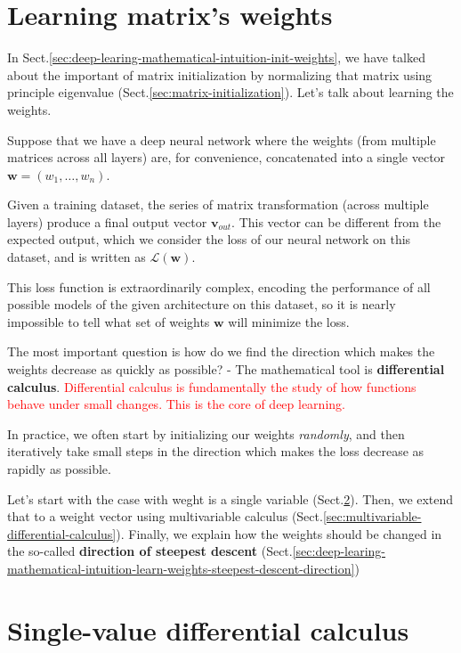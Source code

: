 \section{Learning matrix's weights}
\label{sec:learning-matrix-weights}
\label{sec:deep-learing-mathematical-intuition-learn-weights}

In Sect.\ref{sec:deep-learing-mathematical-intuition-init-weights},
we have talked about the important of matrix initialization by normalizing that
matrix using principle eigenvalue (Sect.\ref{sec:matrix-initialization}). Let's
talk about learning the weights.

Suppose that we have a deep neural network where the weights (from multiple
matrices across all layers) are, for convenience, concatenated into a single
vector $\mathbf{w} = (w_1, \ldots,w_n)$.

Given a training dataset, the series of matrix transformation (across multiple
layers) produce a final output vector $\mathbf{v}_{out}$.
This vector can be different from the expected output, which we consider the
loss of our neural network on this dataset, and is written as
$\mathcal{L}(\mathbf{w})$.

This loss function is extraordinarily complex, encoding the performance of all
possible models of the given architecture on this dataset, so it is nearly
impossible to tell what set of weights $\mathbf{w}$ will minimize the loss.

The most important question is how do we find the direction which makes the
weights decrease as quickly as possible? - The mathematical tool is {\bf
differential calculus}. \textcolor{red}{Differential calculus is fundamentally
the study of how functions behave under small changes. This is the core of deep
learning.}

In practice, we often start by initializing our weights {\it randomly}, and then
iteratively take small steps in the direction which makes the loss decrease as
rapidly as possible.

Let's start with the case with weght is a single variable
(Sect.\ref{sec:single-value-differential-calculus}). Then, we extend that to a
weight vector using multivariable calculus
(Sect.\ref{sec:multivariable-differential-calculus}).
Finally, we explain how the weights should be changed in the so-called 
{\bf direction of steepest descent} (Sect.\ref{sec:deep-learing-mathematical-intuition-learn-weights-steepest-descent-direction})


\section{Single-value differential calculus}
\label{sec:single-value-differential-calculus}


